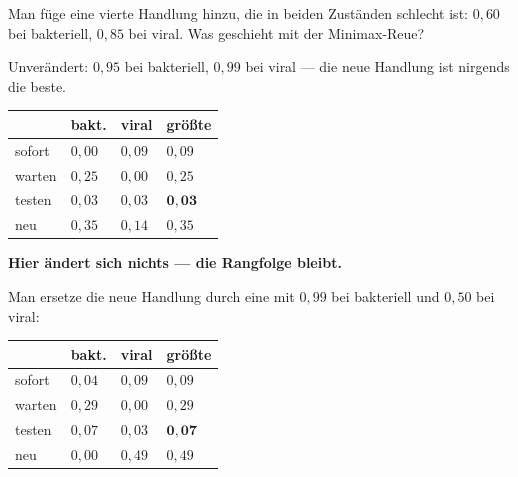 \begin{aufgabe}
Man füge eine vierte Handlung hinzu, die in beiden Zuständen schlecht ist: $0{,}60$ bei bakteriell, $0{,}85$ bei viral. Was geschieht mit der Minimax-Reue?

\loesung
{}
Unverändert: $0{,}95$ bei bakteriell, $0{,}99$ bei viral --- die neue Handlung ist nirgends die beste.

\begin{center}
{\small
\renewcommand{\arraystretch}{1.48}
\begin{tabular}{@{}P{2.2cm}P{1.8cm}P{1.8cm}P{2.0cm}@{}}
\toprule
& \textbf{bakt.} & \textbf{viral} & \textbf{größte}\\
\midrule
sofort & $0{,}00$ & $0{,}09$ & $0{,}09$\\
warten & $0{,}25$ & $0{,}00$ & $0{,}25$\\
testen & $0{,}03$ & $0{,}03$ & $\mathbf{0{,}03}$\\
neu & $0{,}35$ & $0{,}14$ & $0{,}35$\\
\bottomrule
\end{tabular}}
\end{center}

\begin{center}
\begin{minipage}{0.9\textwidth}
\textbf{Hier ändert sich nichts --- die Rangfolge bleibt.}
\end{minipage}
\end{center}

Man ersetze die neue Handlung durch eine mit $0{,}99$ bei bakteriell und $0{,}50$ bei viral:
\begin{center}
{\small
\renewcommand{\arraystretch}{1.48}
\begin{tabular}{@{}P{2.2cm}P{1.8cm}P{1.8cm}P{2.0cm}@{}}
\toprule
& \textbf{bakt.} & \textbf{viral} & \textbf{größte}\\
\midrule
sofort & $0{,}04$ & $0{,}09$ & $0{,}09$\\
warten & $0{,}29$ & $0{,}00$ & $0{,}29$\\
testen & $0{,}07$ & $0{,}03$ & $\mathbf{0{,}07}$\\
neu & $0{,}00$ & $0{,}49$ & $0{,}49$\\
\bottomrule
\end{tabular}}
\end{center}

\begin{center}
\begin{minipage}{0.88\textwidth}
\end{minipage}
\end{center}
\end{aufgabe}

